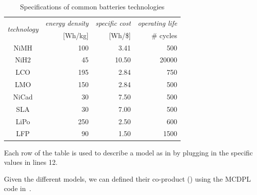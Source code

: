 \documentclass[twocolumn,english]{IEEEtran}
\providecommand{\tabularnewline}{\\}
\theoremstyle{definition}
\theoremstyle{plain}
\theoremstyle{definition}
\theoremstyle{remark}
\theoremstyle{definition}
\theoremstyle{plain}
\theoremstyle{plain}
\newcommand{\tableColors}{\rowcolors{2}{green!4}{blue!4}}
\begin{document}
\begin{table}[H]
\begin{centering}
\caption{\label{tab:batteries}Specifications of common batteries technologies}
\par\end{centering}
\centering{}\setlength\extrarowheight{0.5pt}{\footnotesize{}}
\begin{tabular}{crrr}
\multirow{2}{*}{{\footnotesize{}\tableColors}\emph{\footnotesize{}technology}} & \emph{\footnotesize{}energy density} & \emph{\footnotesize{}specific cost} & \emph{\footnotesize{}operating life}\tabularnewline
 & {\footnotesize{}{[}Wh/kg{]}} & {\footnotesize{}{[}Wh/\${]}} & \# cycles\tabularnewline
{\footnotesize{}NiMH} & {\footnotesize{}100} & {\footnotesize{}3.41} & {\footnotesize{}500 }\tabularnewline
{\footnotesize{}NiH2} & {\footnotesize{}45} & {\footnotesize{}10.50} & {\footnotesize{}20000}\tabularnewline
{\footnotesize{}LCO} & {\footnotesize{}195} & {\footnotesize{}2.84} & {\footnotesize{}750}\tabularnewline
{\footnotesize{}LMO} & {\footnotesize{}150} & {\footnotesize{}2.84} & {\footnotesize{}500}\tabularnewline
{\footnotesize{}NiCad} & {\footnotesize{}30} & {\footnotesize{}7.50} & {\footnotesize{}500}\tabularnewline
{\footnotesize{}SLA} & {\footnotesize{}30} & {\footnotesize{}7.00} & {\footnotesize{}500}\tabularnewline
{\footnotesize{}LiPo} & {\footnotesize{}250} & {\footnotesize{}2.50} & {\footnotesize{}600}\tabularnewline
{\footnotesize{}LFP} & {\footnotesize{}90} & {\footnotesize{}1.50} & {\footnotesize{}1500}\tabularnewline
\end{tabular}{\footnotesize \par}
\end{table}

Each row of the table is used to describe a model as in 
by plugging in the specific values in lines 12.

Given the different models, we can defined their co-product ()
using the MCDPL code in~. 
\end{document}
